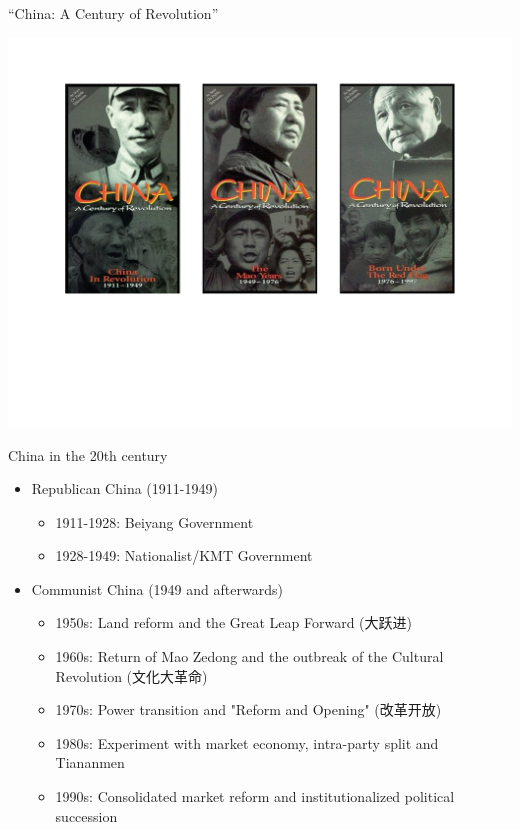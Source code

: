 \documentclass[
  10pt,
  ignorenonframetext,
]{beamer}
\begin{document}
\begin{frame}{``China: A Century of Revolution''}
\label{china-a-century-of-revolution}
\begin{center}\includegraphics[width=0.95\linewidth]{Figs/docs} \end{center}
\end{frame}

\begin{frame}{China in the 20th century}
\label{china-in-the-20th-century}
\begin{itemize}
  \item Republican China (1911-1949)
  \vspace{0.2cm}
  \begin{itemize}
    \item 1911-1928: Beiyang Government
    \item 1928-1949: Nationalist/KMT Government 
  \end{itemize}
  \vspace{0.4cm}
  \item Communist China (1949 and afterwards)
  \vspace{0.2cm}
  \begin{itemize}
    \item 1950s: Land reform and the Great Leap Forward (大跃进)
    \item 1960s: Return of Mao Zedong and the outbreak of the Cultural Revolution (文化大革命)
    \item 1970s: Power transition and "Reform and Opening" (改革开放)
    \item 1980s: Experiment with market economy, intra-party split and Tiananmen
    \item 1990s: Consolidated market reform and institutionalized political succession
  \end{itemize}
\end{itemize}
\end{frame}
\end{document}
